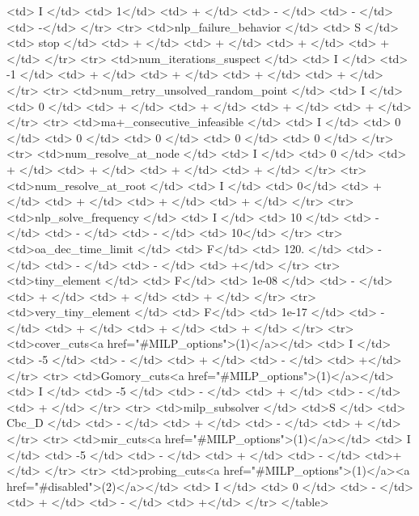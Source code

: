 {\begin{rawhtml}
    <td> I </td>
    <td> 1</td>
    <td> + </td>
    <td> - </td>
    <td> - </td>
    <td> -</td>
  </tr>
  <tr>
    <td>nlp_failure_behavior </td>
    <td> S </td>
    <td> stop </td>
    <td> + </td>
    <td> + </td>
    <td> + </td>
    <td> + </td>
  </tr>
  <tr>
    <td>num_iterations_suspect </td>
    <td> I </td>
    <td> -1 </td>
    <td> + </td>
    <td> + </td>
    <td> + </td>
    <td> + </td>
  </tr>
  <tr>
    <td>num_retry_unsolved_random_point </td>
    <td> I </td>
    <td> 0 </td>
    <td> + </td>
    <td> + </td>
    <td> + </td>
    <td> + </td>
  </tr>
  <tr>
    <td>ma+_consecutive_infeasible </td>
    <td> I </td>
    <td> 0 </td>
    <td> 0 </td>
    <td> 0 </td>
    <td> 0 </td>
    <td> 0 </td>
  </tr>
  <tr>
    <td>num_resolve_at_node </td>
    <td> I </td>
    <td> 0 </td>
    <td> + </td>
    <td> + </td>
    <td> + </td>
    <td> + </td>
  </tr>
  <tr>
    <td>num_resolve_at_root </td>
    <td> I </td>
    <td> 0</td>
    <td> + </td>
    <td> + </td>
    <td> + </td>
    <td> + </td>
  </tr>
  <tr>
    <td>nlp_solve_frequency </td>
    <td> I </td>
    <td> 10 </td>
    <td> - </td>
    <td> - </td>
    <td> - </td>
    <td> 10</td>
  </tr>
  <tr>
    <td>oa_dec_time_limit </td>
    <td> F</td>
    <td> 120. </td>
    <td> - </td>
    <td> - </td>
    <td> - </td>
    <td> +</td>
  </tr>
  <tr>
    <td>tiny_element </td>
    <td> F</td>
    <td> 1e-08 </td>
    <td> - </td>
    <td> + </td>
    <td> + </td>
    <td> + </td>
  </tr>
  <tr>
    <td>very_tiny_element </td>
    <td> F</td>
    <td> 1e-17 </td>
    <td> - </td>
    <td> + </td>
    <td> + </td>
    <td> + </td>
  </tr>
    <tr>
    <td>cover_cuts<a href="#MILP_options">(1)</a></td>
    <td> I </td>
    <td> -5 </td>
    <td> - </td>
    <td> + </td>
    <td> - </td>
    <td> +</td>
  </tr>
  <tr>
    <td>Gomory_cuts<a href="#MILP_options">(1)</a></td>
    <td> I </td>
    <td> -5 </td>
    <td> - </td>
    <td> + </td>
    <td> - </td>
    <td> + </td>
  </tr>
  <tr>
    <td>milp_subsolver </td>
    <td>S </td>
    <td> Cbc_D </td>
    <td> - </td>
    <td> + </td>
    <td> - </td>
    <td> + </td>
  </tr>
  <tr>
    <td>mir_cuts<a href="#MILP_options">(1)</a></td>
    <td> I </td>
    <td> -5 </td>
    <td> - </td>
    <td> + </td>
    <td> - </td>
    <td>+</td>
  </tr>
  <tr>
    <td>probing_cuts<a href="#MILP_options">(1)</a><a href="#disabled">(2)</a></td>
    <td> I </td>
    <td> 0 </td>
    <td> - </td>
    <td> + </td>
    <td> - </td>
    <td> +</td>
  </tr>
</table>
\end{rawhtml}
}


